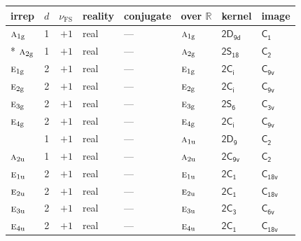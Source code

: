 \documentclass[10pt,a4paper]{article}
\numberwithin{equation}{section}
\newcommand{\grp}[1]{\mathsf{#1}}
\newcommand{\irr}[1]{\text{\normalfont\scshape #1}}
\newcommand{\detbox}[1]{{\setlength{\fboxsep}{1pt}\fbox{#1}}}
\newcommand{\ptag}[1]{\mathrm{#1}}
\newcommand{\fsind}{\nu_{\mathrm{FS}}}
\begin{document}
{\small\renewcommand{\arraystretch}{1.25}\setlength{\tabcolsep}{4pt}\begin{longtable}{@{}lrrlllll@{}}\toprule
irrep & $d$ & $\fsind$ & reality & conjugate & over $\mathbb{R}$ & kernel & image\\\midrule\endhead
\bottomrule\endfoot\endlastfoot
$\irr{a}_{1\ptag{g}}$ & 1 & $+1$ & real & --- & $\irr{a}_{1\ptag{g}}$ & \href{2D9d.pdf}{$\grp{2D_{9d}}$} & \href{../../../rotation/data/pdf/C1.pdf}{$\grp{C_{1}}$}\\*
$\irr{a}_{2\ptag{g}}$ & 1 & $+1$ & real & --- & $\irr{a}_{2\ptag{g}}$ & \href{2S18.pdf}{$\grp{2S_{18}}$} & \href{../../../rotation/data/pdf/C2.pdf}{$\grp{C_{2}}$}\\
$\irr{e}_{1\ptag{g}}$ & 2 & $+1$ & real & --- & $\irr{e}_{1\ptag{g}}$ & \href{2S2.pdf}{$\grp{2C_{i}}$} & \href{../../../rotation/data/pdf/C9v.pdf}{$\grp{C_{9v}}$}\\
$\irr{e}_{2\ptag{g}}$ & 2 & $+1$ & real & --- & $\irr{e}_{2\ptag{g}}$ & \href{2S2.pdf}{$\grp{2C_{i}}$} & \href{../../../rotation/data/pdf/C9v.pdf}{$\grp{C_{9v}}$}\\
$\irr{e}_{3\ptag{g}}$ & 2 & $+1$ & real & --- & $\irr{e}_{3\ptag{g}}$ & \href{2S6.pdf}{$\grp{2S_{6}}$} & \href{../../../rotation/data/pdf/C3v.pdf}{$\grp{C_{3v}}$}\\
$\irr{e}_{4\ptag{g}}$ & 2 & $+1$ & real & --- & $\irr{e}_{4\ptag{g}}$ & \href{2S2.pdf}{$\grp{2C_{i}}$} & \href{../../../rotation/data/pdf/C9v.pdf}{$\grp{C_{9v}}$}\\
\detbox{$\irr{a}_{1\ptag{u}}$} & 1 & $+1$ & real & --- & $\irr{a}_{1\ptag{u}}$ & \href{2D9.pdf}{$\grp{2D_{9}}$} & \href{../../../rotation/data/pdf/C2.pdf}{$\grp{C_{2}}$}\\
$\irr{a}_{2\ptag{u}}$ & 1 & $+1$ & real & --- & $\irr{a}_{2\ptag{u}}$ & \href{2C9v.pdf}{$\grp{2C_{9v}}$} & \href{../../../rotation/data/pdf/C2.pdf}{$\grp{C_{2}}$}\\
$\irr{e}_{1\ptag{u}}$ & 2 & $+1$ & real & --- & $\irr{e}_{1\ptag{u}}$ & \href{2C1.pdf}{$\grp{2C_{1}}$} & $\grp{C_{18v}}$\\
$\irr{e}_{2\ptag{u}}$ & 2 & $+1$ & real & --- & $\irr{e}_{2\ptag{u}}$ & \href{2C1.pdf}{$\grp{2C_{1}}$} & $\grp{C_{18v}}$\\
$\irr{e}_{3\ptag{u}}$ & 2 & $+1$ & real & --- & $\irr{e}_{3\ptag{u}}$ & \href{2C3.pdf}{$\grp{2C_{3}}$} & \href{../../../rotation/data/pdf/C6v.pdf}{$\grp{C_{6v}}$}\\
$\irr{e}_{4\ptag{u}}$ & 2 & $+1$ & real & --- & $\irr{e}_{4\ptag{u}}$ & \href{2C1.pdf}{$\grp{2C_{1}}$} & $\grp{C_{18v}}$\\

\end{longtable}}
\end{document}
